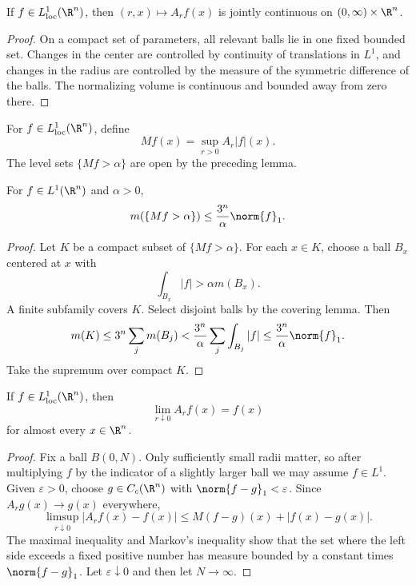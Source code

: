 \begin{lem}
If $f\in L^1_{\loc}(\R^n)$, then $(r,x)\mapsto A_rf(x)$ is jointly continuous on $(0,\infty)\times\R^n$.
\end{lem}

\begin{proof}
On a compact set of parameters, all relevant balls lie in one fixed bounded set. Changes in the center are controlled by continuity of translations in $L^1$, and changes in the radius are controlled by the measure of the symmetric difference of the balls. The normalizing volume is continuous and bounded away from zero there.
\end{proof}

\begin{de}
For $f\in L^1_{\loc}(\R^n)$, define
\[
Mf(x)=\sup_{r>0}A_r|f|(x).
\]
The level sets $\{Mf>\alpha\}$ are open by the preceding lemma.
\end{de}

\begin{thm}
For $f\in L^1(\R^n)$ and $\alpha>0$,
\[
m(\{Mf>\alpha\})\leq\frac{3^n}{\alpha}\norm{f}_1.
\]
\end{thm}

\begin{proof}
Let $K$ be a compact subset of $\{Mf>\alpha\}$. For each $x\in K$, choose a ball $B_x$ centered at $x$ with
\[
\int_{B_x}|f|>\alpha m(B_x).
\]
A finite subfamily covers $K$. Select disjoint balls by the covering lemma. Then
\[
m(K)\leq3^n\sum_jm(B_j)
<\frac{3^n}{\alpha}\sum_j\int_{B_j}|f|
\leq\frac{3^n}{\alpha}\norm{f}_1.
\]
Take the supremum over compact $K$.
\end{proof}

\begin{thm}
If $f\in L^1_{\loc}(\R^n)$, then
\[
\lim_{r\downarrow0}A_rf(x)=f(x)
\]
for almost every $x\in\R^n$.
\end{thm}

\begin{proof}
Fix a ball $B(0,N)$. Only sufficiently small radii matter, so after multiplying $f$ by the indicator of a slightly larger ball we may assume $f\in L^1$. Given $\varepsilon>0$, choose $g\in C_c(\R^n)$ with $\norm{f-g}_1<\varepsilon$. Since $A_rg(x)\to g(x)$ everywhere,
\[
\limsup_{r\downarrow0}|A_rf(x)-f(x)|
\leq M(f-g)(x)+|f(x)-g(x)|.
\]
The maximal inequality and Markov's inequality show that the set where the left side exceeds a fixed positive number has measure bounded by a constant times $\norm{f-g}_1$. Let $\varepsilon\downarrow0$ and then let $N\to\infty$.
\end{proof}

